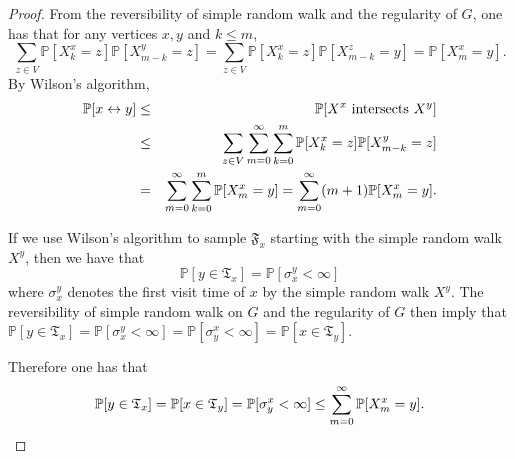 \documentclass[12pt]{article}
\numberwithin{equation}{section}
\newcommand{\1}{\mathbf{1}}
\begin{document}
 \begin{proof}
 	 
 	
 	From the reversibility of simple random walk and the regularity of $G$, one has that for any vertices $x,y$ and $k\leq m$,
 	\[
 	\sum_{z\in V}\mathbb{P}[X_k^x=z]\mathbb{P}[X_{m-k}^y=z]=
 	\sum_{z\in V}\mathbb{P}[X_k^x=z]\mathbb{P}[X_{m-k}^z=y]=\mathbb{P}[X_m^x=y].
 	\]
 	By  Wilson's algorithm, 
 	\begin{eqnarray*}
 	\mathbb{P}[x\leftrightarrow y]&\leq& \mathbb{P}[X^x \textnormal{ intersects }X^y]\\
 	&\leq& \sum_{z\in V}\sum_{m=0}^{\infty}\sum_{k=0}^{m}\mathbb{P}[X_k^x=z]\mathbb{P}[X_{m-k}^y=z]\\
 	&=& \sum_{m=0}^{\infty}\sum_{k=0}^{m}\mathbb{P}[X_m^x=y]=\sum_{m=0}^{\infty}(m+1)\mathbb{P}[X_m^x=y].
 	\end{eqnarray*}
 		
 	
 	 If we use Wilson's algorithm to sample $\mathfrak{F}_x$ starting with the simple random walk $X^y$, then we have that 
 	 \[
 	 \mathbb{P}[y\in\mathfrak{T}_x]=\mathbb{P}[\sigma_x^y<\infty]
 	 \]
 	 where $\sigma_x^y$ denotes the first visit time of $x$ by the simple random walk $X^y$.
 	 The reversibility of simple random walk on $G$ and the regularity of $G$ then imply that $\mathbb{P}[y\in\mathfrak{T}_x]=\mathbb{P}[\sigma_x^y<\infty]=\mathbb{P}[\sigma_y^x<\infty]=\mathbb{P}[x\in\mathfrak{T}_y]$.
 	 
 	 Therefore one has that 
 	 \[
 	 \mathbb{P}[y\in\mathfrak{T}_x]=\mathbb{P}[x\in\mathfrak{T}_y]=\mathbb{P}[\sigma_y^x<\infty] \leq\sum_{m=0}^{\infty}\mathbb{P}[X_m^x=y].\qedhere
 	 \]
 \end{proof}
 
\end{document}
